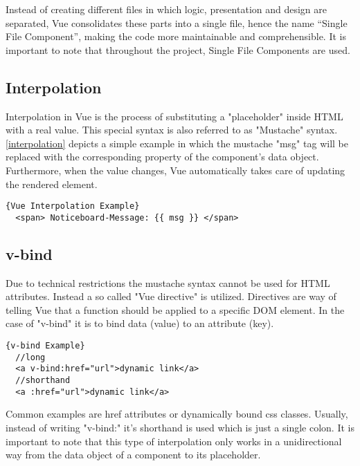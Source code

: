 Instead of creating different files in which logic, presentation and design are separated, Vue consolidates these parts into a single file, hence the name “Single File Component”, making the code more maintainable and comprehensible. It is important to note that throughout the project, Single File Components are used. 

\subsection{Interpolation}
Interpolation in Vue is the process of substituting a "placeholder" inside HTML with a real value. This special syntax is also referred to as "Mustache" syntax. \autoref{interpolation} depicts a simple example in which the mustache "msg" tag will be replaced with the corresponding property of the component's data object. Furthermore, when the value changes, Vue automatically takes care of updating the rendered element. \newline

\begin{lstlisting}[caption=Interpolation Example, captionpos=b, style=htmlcssjs, label=interpolation]{Vue Interpolation Example}
  <span> Noticeboard-Message: {{ msg }} </span> 
\end{lstlisting}

\subsection{v-bind}
Due to technical restrictions the mustache syntax cannot be used for HTML attributes. Instead a so called "Vue directive" is utilized. Directives are way of telling Vue that a function should be applied to a specific DOM element. In the case of "v-bind" it is to bind data (value) to an attribute (key). \newline

\begin{lstlisting}[caption=v-bind Example, captionpos=b, style=htmlcssjs, label=vbind]{v-bind Example}
  //long
  <a v-bind:href="url">dynamic link</a>
  //shorthand
  <a :href="url">dynamic link</a>
\end{lstlisting}

Common examples are href attributes or dynamically bound css classes. Usually, instead of writing "v-bind:" it's shorthand is used which is just a single colon. It is important to note that this type of interpolation only works in a unidirectional way from the data object of a component to its placeholder. 

